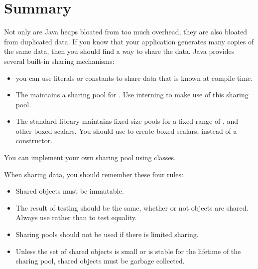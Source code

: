 

\section{Summary} 
Not only are Java heaps bloated from too much overhead, they
are also bloated from duplicated data. If you know that your application
generates many copies of the same data, then you should find a way to share the
data. Java provides several built-in sharing mechanisms:

\begin{itemize}
  \item you can use  literals or  constants to share
  data that is known at compile time.
  \item The \jre maintains a sharing
  pool for . Use  interning to make use of this
  sharing pool.
  \item The standard library maintains fixed-size pools for
   a fixed range of , and other boxed scalars. You should use
    to create boxed scalars, instead of a constructor.
\end{itemize}

You can implement your own sharing pool using  classes.

When sharing data, you should remember these four rules:
\begin{itemize}
  \item Shared objects must be immutable.
  \item The result of  testing should be the same, whether or
not objects are shared.  Always use  rather than \code{==} to
test equality.
  \item Sharing pools should not be used if there is limited sharing.
  \item Unless the set of shared objects is small or is stable for
  the lifetime of the sharing pool, shared objects must be garbage
  collected.
\end{itemize}





